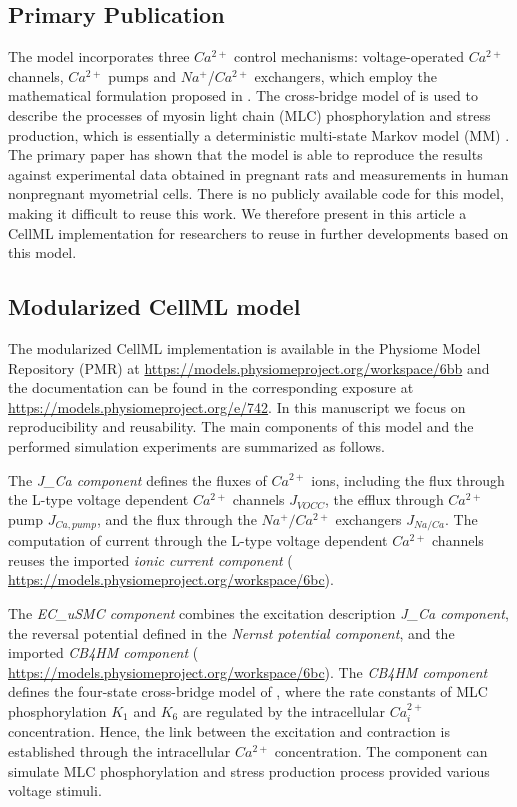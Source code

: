 \documentclass[fleqn,10pt]{physiome}
\begin{document}
\subsection{Primary Publication}
The model \citep{bursztyn2007mathematical} incorporates three $Ca^{2+}$ control mechanisms: voltage-operated $Ca^{2+}$ channels, $Ca^{2+}$ pumps and $Na^{+}$/$Ca^{2+}$ exchangers, which employ the mathematical formulation proposed in \citep{parthimos1999minimal}. The cross-bridge model of \citet{hai1988cross} is used to describe the processes of myosin light chain (MLC) phosphorylation and stress production, which is essentially a deterministic multi-state Markov model (MM) \citep{19961078}. The primary paper \citep{bursztyn2007mathematical} has shown that the model is able to reproduce the results against experimental data obtained in pregnant rats and measurements in human nonpregnant myometrial cells. There is no publicly available code for this model, making it difficult to reuse this work. We therefore present in this article a CellML implementation for researchers to reuse in further developments based on this model.

\subsection{Modularized CellML model}
The modularized CellML implementation is available in the Physiome Model Repository (PMR) at \url{https://models.physiomeproject.org/workspace/6bb} and the documentation can be found in the corresponding exposure at \url{https://models.physiomeproject.org/e/742}. In this manuscript we focus on reproducibility and reusability. The main components of this model and the performed simulation experiments are summarized as follows.

The \emph{J\_Ca component} defines the fluxes of $Ca^{2+}$ ions, including the flux through the L-type voltage dependent $Ca^{2+}$ channels $J_{VOCC}$, the efflux through $Ca^{2+}$ pump $J_{Ca,pump}$, and the flux through the $Na^{+}/Ca^{2+}$ exchangers $J_{Na/Ca}$. The computation of current through the L-type voltage dependent $Ca^{2+}$ channels reuses the imported \emph{ionic current component} ( \url{https://models.physiomeproject.org/workspace/6bc}). 

The \emph{EC\_uSMC component} combines the excitation description \emph{J\_Ca component}, the reversal potential defined in the \emph{Nernst potential component}, and the imported \emph{CB4HM component} ( \url{https://models.physiomeproject.org/workspace/6bc}). The \emph{CB4HM component} defines the four-state cross-bridge model of \citet{hai1988cross}, where the rate constants of MLC phosphorylation $K_1$ and $K_6$ are regulated by the intracellular $Ca_{i}^{2+}$  concentration. Hence, the link between the excitation and contraction is established through the intracellular $Ca^{2+}$ concentration. The component can simulate MLC phosphorylation and stress production process provided various voltage stimuli. 
\end{document}
